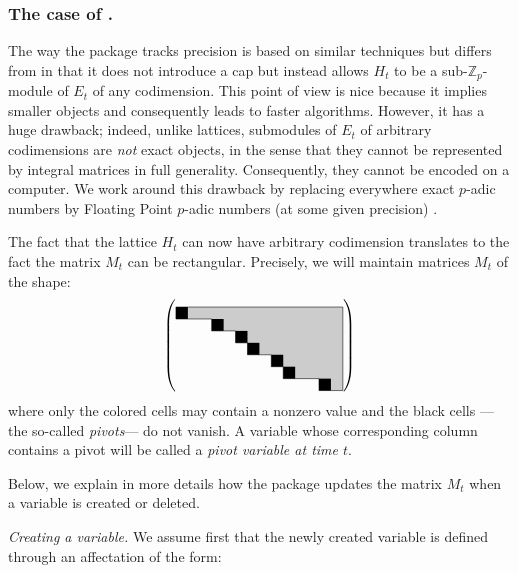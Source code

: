 \documentclass[sigconf]{acmart}
\newcommand{\Z}{\mathbb Z}
\newcommand{\Zp}{\Z_p}
\newcommand{\ZpLC}{\text{\rm \tt ZpLC}\xspace}
\newcommand{\ZpLF}{\text{\rm \tt ZpLF}\xspace}
\theoremstyle{definition}
\begin{document}
\subsubsection{The case of \ZpLF.}

The way the package \ZpLF tracks precision is based on similar 
techniques but differs from \ZpLC in that it does not introduce a cap 
but instead allows $H_t$ to be a sub-$\Zp$-module of $E_t$ of any 
codimension.
This point of view is nice because it implies smaller objects and 
consequently leads to faster algorithms. However, it has a huge 
drawback; indeed, unlike lattices, submodules of $E_t$ of arbitrary 
codimensions are \emph{not} exact objects, in the sense that they cannot 
be represented by integral matrices in full generality. Consequently,
they cannot be encoded on a computer.
We work around this drawback by replacing everywhere exact $p$-adic 
numbers by Floating Point $p$-adic numbers (at some given precision) 
\cite{}.

The fact that the lattice $H_t$ can now have arbitrary codimension
translates to the fact the matrix $M_t$ can be rectangular.
Precisely, we will maintain matrices $M_t$ of the shape:
\begin{equation}
\label{eq:shapeM-ZpLF}
\left(\raisebox{-0.5\height}{\begin{tikzpicture}[scale=0.3]
\fill[black!20] (0,0)--(0,-1)--(3,-1)--(3,-2)--(5,-2)--(5,-3)
    --(6,-3)--(6,-4)--(8,-4)--(8,-5)--(9,-5)--(9,-6)--(12,-6)
    --(12,-7)--(14,-7)--(14,0)--cycle;
\draw (0,0)--(0,-1)--(3,-1)--(3,-2)--(5,-2)--(5,-3)
    --(6,-3)--(6,-4)--(8,-4)--(8,-5)--(9,-5)--(9,-6)--(12,-6)
    --(12,-7)--(14,-7);
\fill (0,0) rectangle (1,-1);
\fill (3,-1) rectangle (4,-2);
\fill (5,-2) rectangle (6,-3);
\fill (6,-3) rectangle (7,-4);
\fill (8,-4) rectangle (9,-5);
\fill (9,-5) rectangle (10,-6);
\fill (12,-6) rectangle (13,-7);
\draw[thin] (14,-7)--(14,0)--(0,0);
\end{tikzpicture}}\right)
\end{equation}
where only the colored cells may contain a nonzero value and the 
black cells ---the so-called \emph{pivots}--- do not vanish. A
variable whose corresponding column contains a pivot will be called 
a \emph{pivot variable at time $t$}.

Below, we explain in more details how the package \ZpLF updates 
the matrix $M_t$ when a variable is created or deleted.

\medskip

\noindent \textit{Creating a variable.}
%
We assume first that the newly created variable is defined through an
affectation of the form:
\end{document}
